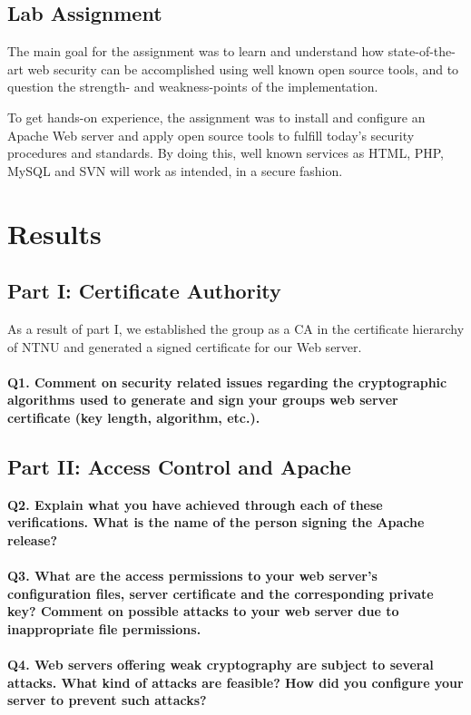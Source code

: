 \documentclass[a4paper, 12pt]{article}
\begin{document}
\subsection{Lab Assignment}
The main goal for the assignment was to learn and understand how state-of-the-art web security can be accomplished using well known open source tools, and to question the strength- and weakness-points of the implementation.

To get hands-on experience, the assignment was to install and configure an Apache Web server and apply open source tools to fulfill today’s security procedures and standards. By doing this, well known services as HTML, PHP, MySQL and SVN will work as intended, in a secure fashion.


\section{Results}

\subsection{Part I: Certificate Authority}
As a result of part I, we established the group as a CA in the certificate hierarchy of NTNU and generated a signed certificate for our Web server. \\ \\
{\bf Q1. Comment on security related issues regarding the cryptographic algorithms used to
generate and sign your groups web server certificate (key length, algorithm, etc.).}


\subsection{Part II: Access Control and Apache}
{\bf Q2. Explain what you have achieved through each of these verifications. What is the name
of the person signing the Apache release?} \\
\\
{\bf Q3. What are the access permissions to your web server’s configuration files, server certificate
and the corresponding private key? Comment on possible attacks to your web server due to
inappropriate file permissions.} \\
\\
{\bf Q4. Web servers offering weak cryptography are subject to several attacks. What kind of
attacks are feasible? How did you configure your server to prevent such attacks?}
\end{document}
